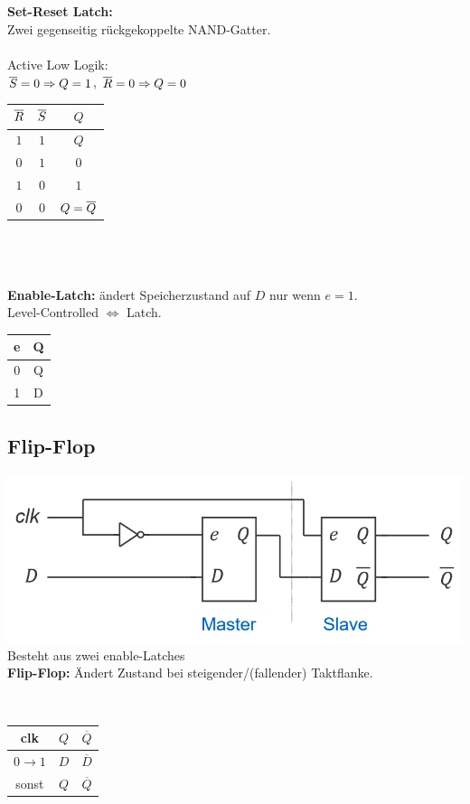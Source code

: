 \documentclass[6pt,a4paper]{scrartcl}
\renewcommand{\emph}[1]{\textsf{\textbf{#1}}}
\newcommand{\ol}[1]{\ensuremath{\overline{#1}}}									%
\newcommand{\ra}[0]{\ensuremath{\rightarrow}} 									%
\newcommand{\n}[0]{\ensuremath{\overline}}										%
\begin{document}
\begin{multicols*}{3}
\begin{minipage}{0.48\linewidth}
				\emph{Set-Reset Latch:} \\ Zwei gegenseitig rückgekoppelte NAND-Gatter.\\\\ Active Low Logik:\\ $\n{S}=0\Rightarrow Q=1$, $\n{R}=0\Rightarrow Q=0$
				\begin{tabular}{c|c|c}
					$\n{R}$ & $\n{S}$ & $Q$ \\ \hline
					$1$ & $1$ & $Q$ \\
					$0$ & $1$ & $0$ \\
					$1$ & $0$ & $1$ \\
					$0$ & $0$ & $Q=\n{Q}$
				\end{tabular}
				\\\\\\
				\emph{Enable-Latch:} ändert Speicherzustand auf $D$ nur wenn $e=1$.\\Level-Controlled $\Leftrightarrow$ Latch.\\
				\begin{tabular}{c|c} e & Q \\ \hline 0 & Q \\ 1 & D \end{tabular}
	\end{minipage}


	\subsection{Flip-Flop}
		\parbox{5cm} {
						\includegraphics[width=\linewidth]{img/logic/flip-flop}
			Besteht aus zwei enable-Latches \\
			\emph{Flip-Flop:} Ändert Zustand bei steigender/(fallender) Taktflanke.\\
		}
		\parbox{.25cm}{\ }
		\parbox{2cm}{
			\begin{tabular}{c|c|c} clk & $Q$ & $\ol Q$ \\ \hline $0 \ra 1$ & $D$ & $\ol D$ \\ sonst & $Q$ & $\ol Q$ \end{tabular}
		}


\end{multicols*}
\end{document}

